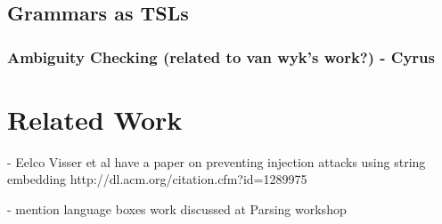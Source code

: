 \subsection{Grammars as TSLs}
\subsubsection{Ambiguity Checking (related to van wyk's work?) - Cyrus}
\section{Related Work}
- Eelco Visser et al have a paper on preventing injection attacks using string embedding http://dl.acm.org/citation.cfm?id=1289975

- mention language boxes work discussed at Parsing workshop

